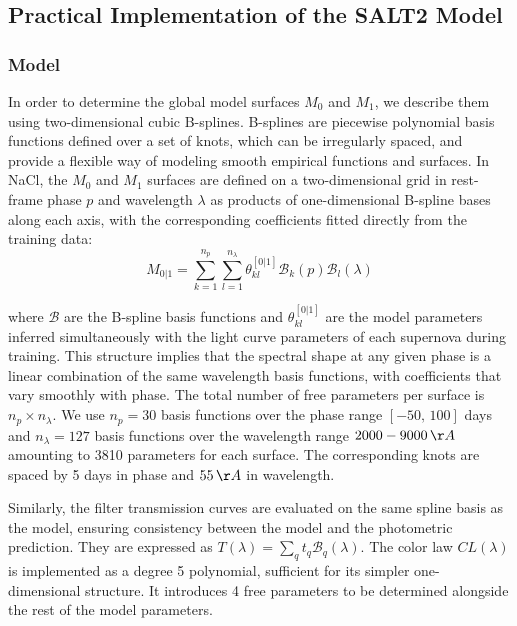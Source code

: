 \subsection{Practical Implementation of the SALT2 Model}

\subsubsection{Model}

In order to determine the global model surfaces $M_0$ and $M_1$, 
we describe them using two-dimensional cubic B-splines. B-splines are piecewise polynomial 
basis functions defined over a set of knots, which can be irregularly spaced, and provide a 
flexible way of modeling smooth empirical functions and surfaces. In NaCl, the $M_0$ and $M_1$ surfaces are defined on a 
two-dimensional grid in rest-frame phase $p$ and wavelength $\lambda$ as products of one-dimensional B-spline 
bases along each axis, with the corresponding coefficients fitted directly from the training data:
\begin{equation}
    M_{0|1}=\sum_{k=1}^{n_p} \sum_{l=1}^{n_{\lambda}} \theta_{kl}^{[0|1]} \mathcal{B}_k(p) \mathcal{B}_l(\lambda)
    \label{eqn:model_spline}
\end{equation}

where $\mathcal{B}$ are the B-spline basis functions and 
$\theta_{kl}^{[0|1]}$ are the model parameters inferred simultaneously 
with the light curve parameters of each supernova during training. This 
structure implies that the spectral shape at any given 
phase is a linear combination of the same wavelength basis functions, 
with coefficients that vary smoothly with phase. The total number of 
free parameters per surface is $n_p \times n_\lambda$. 
We use $n_p=30$ basis functions over the phase range $[-50, \, 100]$ days and $n_\lambda = 127$ basis functions over the wavelength range $2000-9000 \, \AA$ 
amounting to 3810 parameters for each surface. The corresponding knots are spaced by 5 days in phase and $55 \, \AA$ in wavelength.

Similarly, the filter transmission curves 
are evaluated on the same spline basis as the model, ensuring 
consistency between the model and the photometric prediction. They are expressed as $T(\lambda) = \sum_q t_q \mathcal{B}_q(\lambda)$. The 
color law $CL(\lambda)$ is implemented as a degree 5 polynomial, 
sufficient for its simpler one-dimensional structure. It introduces 4 free parameters to be determined alongside the rest of the model parameters.  \\


